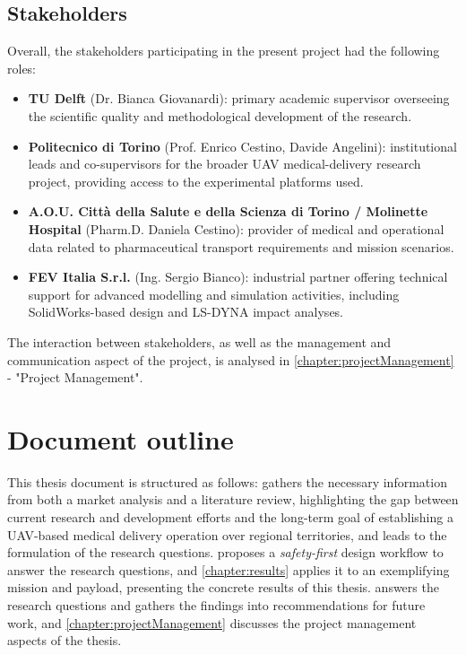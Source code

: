 \subsection{Stakeholders}\label{section:stakeholders}
Overall, the stakeholders participating in the present project had the following roles:

\begin{itemize}
    \item \textbf{TU Delft} (Dr. Bianca Giovanardi): primary academic supervisor overseeing the scientific quality and methodological development of the research.
    \item \textbf{Politecnico di Torino} (Prof. Enrico Cestino, Davide Angelini): institutional leads and co-supervisors for the broader UAV medical-delivery research project, providing access to the experimental platforms used.
    \item \textbf{A.O.U. Città della Salute e della Scienza di Torino / Molinette Hospital} (Pharm.D. Daniela Cestino): provider of medical and operational data related to pharmaceutical transport requirements and mission scenarios.
    \item \textbf{FEV Italia S.r.l.} (Ing. Sergio Bianco): industrial partner offering technical support for advanced modelling and simulation activities, including SolidWorks-based design and LS-DYNA impact analyses.
\end{itemize}

The interaction between stakeholders, as well as the management and communication aspect of the project, is analysed in \cref{chapter:projectManagement} - "Project Management".


\section{Document outline}
This thesis document is structured as follows:  gathers the necessary information from both a market analysis and a literature review, highlighting the gap between current research and development efforts and the long-term goal of establishing a UAV-based medical delivery operation over regional territories, and leads to the formulation of the research questions.  proposes a \textit{safety-first} design workflow to answer the research questions, and \cref{chapter:results} applies it to an exemplifying mission and payload, presenting the concrete results of this thesis.  answers the research questions and gathers the findings into recommendations for future work, and \cref{chapter:projectManagement} discusses the project management aspects of the thesis.





